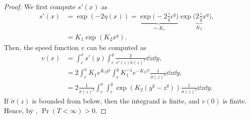 \documentclass[twocolumn,amsthm]{autart}
\begin{document}
\begin{appendix}
\begin{proof}
    We first compute $s'(x)$ as
    \begin{align}
        s'(x) &= \exp(-2 \eta(x)) = \underbrace{\exp\Big(-2 \frac{\gamma}{q} c^q \Big)}_{\coloneqq K_1} \exp\Big( \underbrace{2 \frac{\gamma}{q}}_{K_2} x^q \Big), \\
        &= K_1 \exp(K_2 x^q).
    \end{align}
    Then, the speed function $v$ can be computed as
    \begin{align}
        v(x)
        &= \int_c^x s'(y) \int_c^y \frac{2}{s'(z) \tilde{\sigma}(z)^2} \dd{z} \dd{y}, \\
        &= 2 \int_c^x K_1 e^{K_2 y^q} \int_c^y K_1^{-1} e^{-K_2 z^q} \frac{1}{\tilde{\sigma}(z)^2}\dd{z} \dd{y}, \\
        &= 2\frac{1}{\sigma(z)^2} \int_c^x \int_c^y \exp(K_2 (y^q - z^q)) \frac{1}{\tilde{\sigma}(z)^2}\dd{z} \dd{y}.
    \end{align}
    If $\tilde{\sigma}(z)$ is bounded from below, then the integrand is finite, and $v(0)$ is finite. Hence, by , $\Pr(T < \infty) > 0$.


\end{proof}
\end{appendix}
\end{document}
